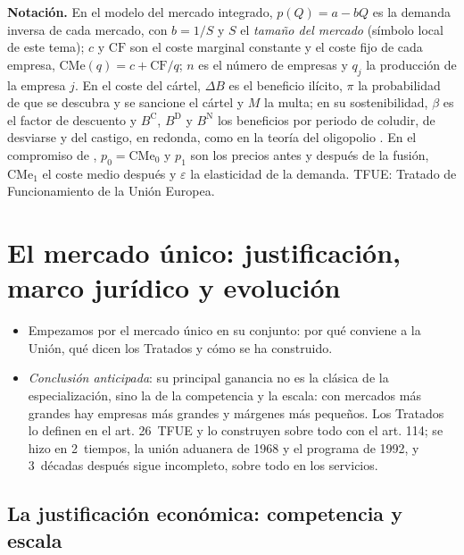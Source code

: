 \documentclass[11pt]{article}
\begin{document}
\begin{anotaciones}
\textbf{Notación.} En el modelo del mercado integrado, $p(Q)=a-bQ$ es la demanda inversa de cada mercado, con $b=1/S$ y $S$ el \emph{tamaño del mercado} (símbolo local de este tema); $c$ y $\mathrm{CF}$ son el coste marginal constante y el coste fijo de cada empresa, $\mathrm{CMe}(q)=c+\mathrm{CF}/q$; $n$ es el número de empresas y $q_j$ la producción de la empresa $j$. En el coste del cártel, $\Delta B$ es el beneficio ilícito, $\pi$ la probabilidad de que se descubra y se sancione el cártel y $M$ la multa; en su sostenibilidad, $\beta$ es el factor de descuento y $B^{\mathrm C}$, $B^{\mathrm D}$ y $B^{\mathrm N}$ los beneficios por periodo de coludir, de desviarse y del castigo, en redonda, como en la teoría del oligopolio . En el compromiso de , $p_0=\mathrm{CMe}_0$ y $p_1$ son los precios antes y después de la fusión, $\mathrm{CMe}_1$ el coste medio después y $\varepsilon$ la elasticidad de la demanda. TFUE: Tratado de Funcionamiento de la Unión Europea.
\end{anotaciones}

\section{El mercado único:\cortetitulo{} justificación, marco jurídico y evolución}\label{sec:mercado-unico}

\begin{itemize}
\item Empezamos por el mercado único en su conjunto: por qué conviene a la Unión, qué dicen los Tratados y cómo se ha construido.
\item \emph{Conclusión anticipada}: su principal ganancia no es la clásica de la especialización, sino la de la competencia y la escala: con mercados más grandes hay empresas más grandes y márgenes más pequeños. Los Tratados lo definen en el art. 26~TFUE y lo construyen sobre todo con el art. 114; se hizo en 2~tiempos, la unión aduanera de 1968 y el programa de 1992, y 3~décadas después sigue incompleto, sobre todo en los servicios.
\end{itemize}

\subsection{La justificación económica: competencia y escala}\label{sec:efectos}
\end{document}
